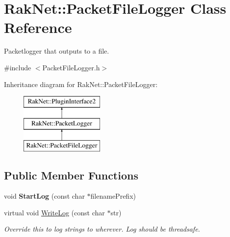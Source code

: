 \hypertarget{class_rak_net_1_1_packet_file_logger}{\section{Rak\-Net\-:\-:Packet\-File\-Logger Class Reference}
\label{class_rak_net_1_1_packet_file_logger}
}


Packetlogger that outputs to a file.  




{\ttfamily \#include $<$Packet\-File\-Logger.\-h$>$}

Inheritance diagram for Rak\-Net\-:\-:Packet\-File\-Logger\-:\begin{figure}[H]
\begin{center}
\leavevmode
\includegraphics[height=3.000000cm]{class_rak_net_1_1_packet_file_logger}
\end{center}
\end{figure}
\subsection*{Public Member Functions}
\begin{DoxyCompactItemize}
\item 
\hypertarget{class_rak_net_1_1_packet_file_logger_ac6e481843737ecd6670323399f2c8b6c}{void {\bfseries Start\-Log} (const char $\ast$filename\-Prefix)}\label{class_rak_net_1_1_packet_file_logger_ac6e481843737ecd6670323399f2c8b6c}

\item 
\hypertarget{class_rak_net_1_1_packet_file_logger_a6131b1c6efa6ddcf9513adb50021bd34}{virtual void \hyperlink{class_rak_net_1_1_packet_file_logger_a6131b1c6efa6ddcf9513adb50021bd34}{Write\-Log} (const char $\ast$str)}\label{class_rak_net_1_1_packet_file_logger_a6131b1c6efa6ddcf9513adb50021bd34}

\begin{DoxyCompactList}\small\item\em Override this to log strings to wherever. Log should be threadsafe. \end{DoxyCompactList}\end{DoxyCompactItemize}
